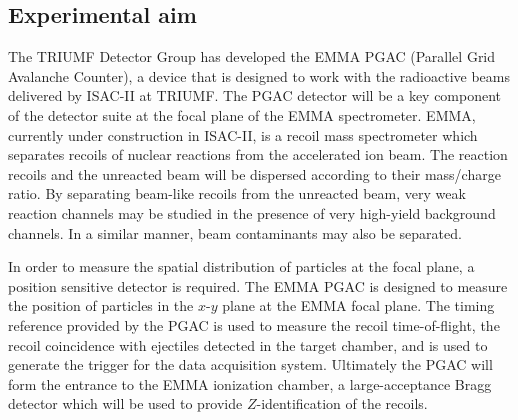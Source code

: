 \subsection{Experimental aim}

The TRIUMF Detector Group has developed %
the EMMA PGAC (Parallel Grid Avalanche Counter), a device that is designed to work with the radioactive beams
delivered by ISAC-II at TRIUMF.  The PGAC detector will be a key component of the detector suite at the focal plane of the EMMA spectrometer.
EMMA, currently under construction in ISAC-II,  is a recoil mass spectrometer 
which %
 separates recoils of nuclear reactions from the accelerated ion beam.  The reaction recoils and the unreacted beam will be dispersed  according to their mass/charge ratio.  By separating beam-like recoils from the unreacted beam, very weak reaction channels may be studied in the presence of very high-yield background channels.  In a similar manner, beam contaminants may also be separated.  
 
In order to measure the spatial distribution of particles at the focal plane, a position sensitive detector is required.  The EMMA PGAC is designed to measure the position of particles in the $x$-$y$ plane at the EMMA focal plane. %
  The timing reference provided by the PGAC is used to measure the recoil time-of-flight, the recoil coincidence with ejectiles detected in the target chamber, and is used to generate the trigger for the data acquisition system.
Ultimately the PGAC will form the entrance to the EMMA ionization chamber, a large-acceptance Bragg detector which will be used to provide $Z$-identification of the  recoils.
 
